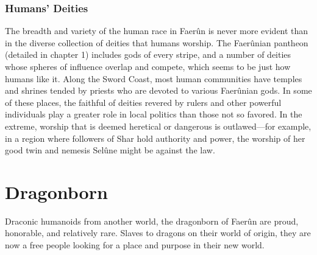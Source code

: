 \documentclass[10pt,a4paper,twoside,twocolumn,openany,bg=print,nodeprecatedcode]{dndbook}
\begin{document}
\subsubsection{Humans' Deities}
The breadth and variety of the human race in Faerûn is never more evident than in the diverse collection of deities that humans worship. The Faerûnian pantheon (detailed in chapter 1) includes gods of every stripe, and a number of deities whose spheres of influence overlap and compete, which seems to be just how humans like it.
Along the Sword Coast, most human communities have temples and shrines tended by priests who are devoted to various Faerûnian gods. In some of these places, the faithful of deities revered by rulers and other powerful individuals play a greater role in local politics than those not so favored. In the extreme, worship that is deemed heretical or dangerous is outlawed—for example, in a region where followers of Shar hold authority and power, the worship of her good twin and nemesis Selûne might be against the law.
\section{Dragonborn}
Draconic humanoids from another world, the dragonborn of Faerûn are proud, honorable, and relatively rare. Slaves to dragons on their world of origin, they are now a free people looking for a place and purpose in their new world.
\end{document}
